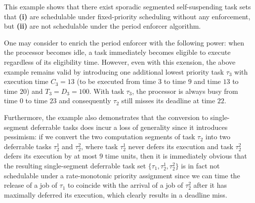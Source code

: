 This example shows that there exist sporadic segmented self-suspending task sets that   \textbf{(i)} are schedulable under fixed-priority scheduling without any enforcement, but \textbf{(ii)} are not schedulable under the period enforcer algorithm.


One may consider to enrich the period enforcer with the following power: when the processor becomes idle, a task immediately becomes eligible to execute regardless of its eligibility time. However, even with this exension, the above example remains valid by introducing one additional lowest priority task $\tau_3$ with execution time $C_3=13$ (to be executed from time $3$ to time $9$ and time $13$ to time $20$) and $T_3=D_3=100$. With task $\tau_3$, the processor is always busy from time $0$ to time $23$ and consequently $\tau_2$ still misses its deadline at time $22$.


Furthermore, the example also demonstrates that the conversion to single-segment deferrable tasks does incur a loss of generality since it introduces pessimism: if we convert the two computation segments of task $\tau_2$ into two deferrable tasks $\tau_2^1$ and $\tau_2^2$, where  task $\tau_2^1$ never defers its execution and task $\tau_2^2$ defers its execution by at most \emph{$9$} time units,  then it is immediately obvious that the resulting single-segment deferrable task set $\{\tau_1, \tau_2^1, \tau_2^2\}$ is in fact not schedulable under a rate-monotonic priority assignment since we can time the release of a job of $\tau_1$ to coincide with the arrival of a job of $\tau_2^2$ after it has maximally deferred its execution, which clearly results in a deadline miss.



